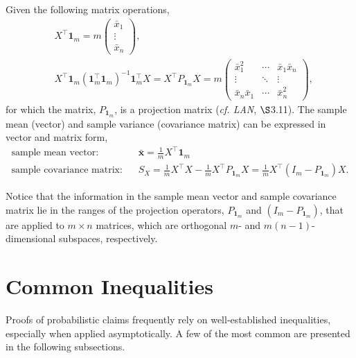 \documentclass[12pt, twoside, draft]{article}
\begin{document}
Given the following matrix operations,
\begin{align}
&X^\top \mathbf{1}_m = m \begin{pmatrix} \bar{x}_1 \\ \vdots \\ \bar{x}_n \end{pmatrix}, \\
&X^\top \mathbf{1}_m (\mathbf{1}_m^\top \mathbf{1}_m)^{-1} \mathbf{1}_m^\top X = X^\top P_{\mathbf{1}_m} X = m
\begin{pmatrix}
\bar{x}_1^2 & \cdots & \bar{x}_1 \bar{x}_n \\
\vdots & \ddots & \vdots \\
\bar{x}_n \bar{x}_1 & \cdots & \bar{x}_n^2
\end{pmatrix},
\end{align}
for which the matrix, $ P_{\mathbf{1}_m}$, is a projection matrix (\textit{cf. LAN}, $\S$3.11).  The sample mean (vector) and sample variance (covariance matrix) can be expressed in vector and matrix form,
\begin{align}
\text{sample mean vector:} \hspace{10pt} & \bar{\mathbf{x}} = \frac{1}{m} X^\top \mathbf{1}_m \label{eq:sample_mean_vector} \\
\text{sample covariance matrix:} \hspace{10pt} & S_X = \frac{1}{m}  X^\top X -  \frac{1}{m} X^\top P_{\mathbf{1}_m} X = \frac{1}{m} X^\top (I_m -  P_{\mathbf{1}_m}) X \label{eq:sample_covariance_vector}.
\end{align}

Notice that the information in the sample mean vector and sample covariance matrix lie in the ranges of the projection operators, $P_{\mathbf{1}_m}$ and $(I_m -  P_{\mathbf{1}_m})$, that are applied to $m \times n$ matrices, which are orthogonal $m$- and $m(n-1)$-dimensional subspaces, respectively.  

\section{Common Inequalities}\label{sec:common_inequalities}
Proofs of probabilistic claims frequently rely on well-established inequalities, especially when applied asymptotically.  A few of the most common are presented in the following subsections.
\end{document}
